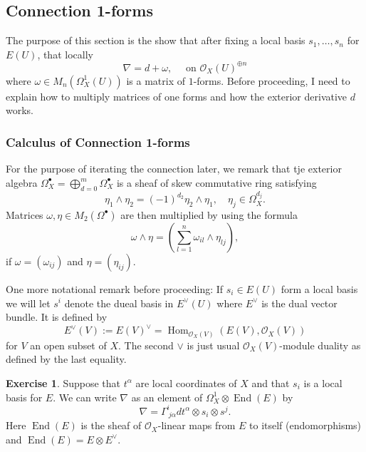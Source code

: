 \documentclass[12pt]{book}
\numberwithin{equation}{section}
\theoremstyle{definition}
\newtheorem{exercise}[theorem]{Exercise}
\theoremstyle{remark}
\newcommand{\Ocal}{\mathcal{O}}
\newcommand{\Hom}{\operatorname{Hom}}
\newcommand{\End}{\operatorname{End}}
\begin{document}
\subsection{Connection 1-forms}
The purpose of this section is the show that after fixing a local basis $s_1,\ldots,s_n$ for $E(U)$, that locally 
$$ \nabla = d + \omega, \quad \mbox{ on $\Ocal_X(U)^{\oplus n}$} $$
where $\omega \in M_n(\Omega_X^1(U))$ is a matrix of $1$-forms.
Before proceeding, I need to explain how to multiply matrices of one forms and how the exterior derivative $d$ works.

\subsubsection{Calculus of Connection 1-forms}
For the purpose of iterating the connection later, we remark that tje exterior algebra $\Omega_X^{\bullet} = \bigoplus_{d=0}^m \Omega_X^{\bullet}$ is a sheaf of skew commutative ring satisfying 
$$\eta_1 \wedge \eta_2 = (-1)^{d_2} \eta_2 \wedge \eta_1, \quad 
\eta_j \in \Omega^{d_j}_{X}.$$
Matrices $\omega,\eta \in M_2(\Omega^{\bullet})$ are then multiplied by using the formula 
$$ \omega \wedge \eta = ( \sum_{l=1}^n \omega_{i l} \wedge \eta_{l j} ),$$
if $\omega = (\omega_{ij})$ and $\eta = (\eta_{ij})$.

One more notational remark before proceeding: If $s_i \in E(U)$ form a local basis we will let $s^i$ denote the dueal basis in $E^{\vee}(U)$ where $E^{\vee}$ is the dual vector bundle. 
It is defined by 
$$E^{\vee}(V) := E(V)^{\vee} = \Hom_{\Ocal_X(V)}(E(V),\Ocal_X(V))$$ 
for $V$ an open subset of $X$. 
The second $\vee$ is just usual $\Ocal_X(V)$-module duality as defined by the last equality.

\begin{exercise}
	Suppose that $t^{\alpha}$ are local coordinates of $X$ and that $s_i$ is a local basis for $E$. 
	We can write $\nabla$ as an element of $\Omega_X^1\otimes \End(E)$ by 
	$$ \nabla = \Gamma^i_{\ j \alpha} dt^{\alpha} \otimes s_i \otimes s^j.$$
	Here $\End(E)$ is the sheaf of $\Ocal_X$-linear maps from $E$ to itself (endomorphisms) and $\End(E) = E \otimes E^{\vee}$.
\end{exercise}
\end{document}
